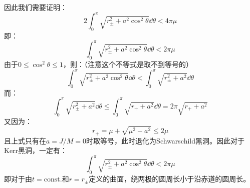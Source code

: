\documentclass[a4paper]{article}
\begin{document}
\begin{enumerate}
\begin{itemize}
\[        \]
        因此我们需要证明：
        \[
            2\int_0^\pi \sqrt{r_\pm^2 + a^2\cos^2{\theta}} \dd{\theta} < 4\pi\mu
        \]
        即：
        \[
            \int_0^\pi \sqrt{r_\pm^2 + a^2\cos^2{\theta}} \dd{\theta} < 2\pi\mu
        \]
        由于$0 \leqslant \cos^2{\theta} \leqslant 1$，则：（注意这个不等式是取不到等号的）
        \[
            \int_0^\pi \sqrt{r_\pm^2 + a^2\cos^2{\theta}} \dd{\theta} < \int_0^\pi \sqrt{r_\pm^2 + a^2} \dd{\theta}
        \]
        而：
        \[
            \int_0^\pi \sqrt{r_\pm^2 + a^2} \dd{\theta} \leqslant \int_0^\pi \sqrt{r_+ + a^2} \dd{\theta} = 2\pi \sqrt{r_+ + a^2}
        \]
        又因为：
        \[
            r_+ = \mu + \sqrt{\mu^2 - a^2} \leqslant 2\mu
        \]
        且上式只有在$a = J/M = 0$时取等号，此时退化为Schwarschild黑洞。因此对于Kerr黑洞，一定有：
        \[
            \int_0^\pi \sqrt{r_\pm^2 + a^2\cos^2{\theta}} \dd{\theta} < 2\pi\mu
        \]
        即对于由$t = \mathrm{const.}$和$r = r_\pm$定义的曲面，绕两极的圆周长小于沿赤道的圆周长。


\end{itemize}
\end{enumerate}
\end{document}
